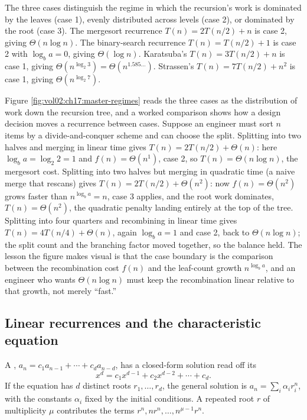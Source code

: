 The three cases distinguish the regime in which the recursion's
work is dominated by the leaves (case 1), evenly distributed
across levels (case 2), or dominated by the root (case 3). The
mergesort recurrence $T(n) = 2 T(n/2) + n$ is case 2, giving
$\Theta(n \log n)$. The binary-search recurrence $T(n) = T(n/2) +
1$ is case 2 with $\log_{b} a = 0$, giving $\Theta(\log n)$.
Karatsuba's $T(n) = 3 T(n/2) + n$ is case 1, giving $\Theta(n^{\log_{2}
3}) = \Theta(n^{1.585\ldots})$. Strassen's $T(n) = 7 T(n/2) +
n^{2}$ is case 1, giving $\Theta(n^{\log_{2} 7})$.

Figure \ref{fig:vol02:ch17:master-regimes} reads the three cases as
the distribution of work down the recursion tree, and a worked
comparison shows how a design decision moves a recurrence between
cases. Suppose an engineer must sort $n$ items by a divide-and-conquer
scheme and can choose the split. Splitting into two halves and merging
in linear time gives $T(n) = 2 T(n/2) + \Theta(n)$: here $\log_{b} a
= \log_{2} 2 = 1$ and $f(n) = \Theta(n^{1})$, case 2, so $T(n) =
\Theta(n \log n)$, the mergesort cost. Splitting into two halves but
merging in quadratic time (a naive merge that rescans) gives $T(n) =
2 T(n/2) + \Theta(n^{2})$: now $f(n) = \Theta(n^{2})$ grows faster
than $n^{\log_{b} a} = n$, case 3 applies, and the root work
dominates, $T(n) = \Theta(n^{2})$, the quadratic penalty landing
entirely at the top of the tree. Splitting into four quarters and
recombining in linear time gives $T(n) = 4 T(n/4) + \Theta(n)$, again
$\log_{b} a = 1$ and case 2, back to $\Theta(n \log n)$; the split
count and the branching factor moved together, so the balance held.
The lesson the figure makes visual is that the case boundary is the
comparison between the recombination cost $f(n)$ and the leaf-count
growth $n^{\log_{b} a}$, and an engineer who wants $\Theta(n \log n)$
must keep the recombination linear relative to that growth, not
merely ``fast.''



\subsection{Linear recurrences and the characteristic equation}

A , $a_{n} = c_{1} a_{n-1} + \cdots + c_{d} a_{n-d}$,
has a closed-form solution read off its 
\[
x^{d} = c_{1} x^{d-1} + c_{2} x^{d-2} + \cdots + c_{d}.
\]
If the equation has $d$ distinct roots $r_{1}, \ldots, r_{d}$, the
general solution is $a_{n} = \sum_{i} \alpha_{i} r_{i}^{n}$, with
the constants $\alpha_{i}$ fixed by the initial conditions. A
repeated root $r$ of multiplicity $\mu$ contributes the terms $r^{n},
n r^{n}, \ldots, n^{\mu-1} r^{n}$.

